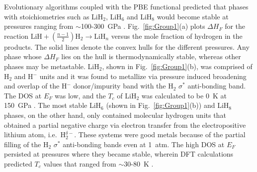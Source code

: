 \documentclass[12pt,letterpaper,oneside]{article}
\begin{document}
Evolutionary algorithms coupled with the PBE functional predicted that phases with stoichiometries such as LiH$_2$, LiH$_6$ and LiH$_8$ would become stable at pressures ranging from $\sim$100-300~GPa \cite{Zurek:2009c}. Fig.\ \ref{fig:Group1}(a) plots $\Delta H_F$ for the reaction $\text{LiH}+\left(\frac{n-1}{2}\right)\text{H}_2\rightarrow \text{LiH}_n$ versus the mole fraction of hydrogen in the products. The solid lines denote the convex hulls for the different pressures. Any phase whose $\Delta H_F$ lies on the hull is thermodynamically stable, whereas other phases may be metastable. LiH$_2$, shown in Fig.\ \ref{fig:Group1}(b), was comprised of H$_2$ and H$^-$ units and it was found to metallize via pressure induced broadening and overlap of the H$^-$ donor/impurity band with the H$_2$ $\sigma^*$ anti-bonding band. The DOS at $E_F$ was low, and the $T_c$ of LiH$_2$ was calculated to be 0~K at 150~GPa \cite{Xie:2014a}. 
The most stable LiH$_6$ (shown in Fig.\ \ref{fig:Group1}(b)) and LiH$_8$ phases, on the other hand, only contained molecular hydrogen units that obtained a partial negative charge via electron transfer from the electropositive lithium atom, i.e.\ H$_2^{\delta-}$. These systems were good metals because of the partial filling of the H$_2$ $\sigma^*$ anti-bonding bands even at 1~atm. The high DOS at $E_F$ persisted at pressures where they became stable, wherein DFT calculations predicted $T_c$ values that ranged from $\sim$30-80~K \cite{Xie:2014a}. 
\end{document}
